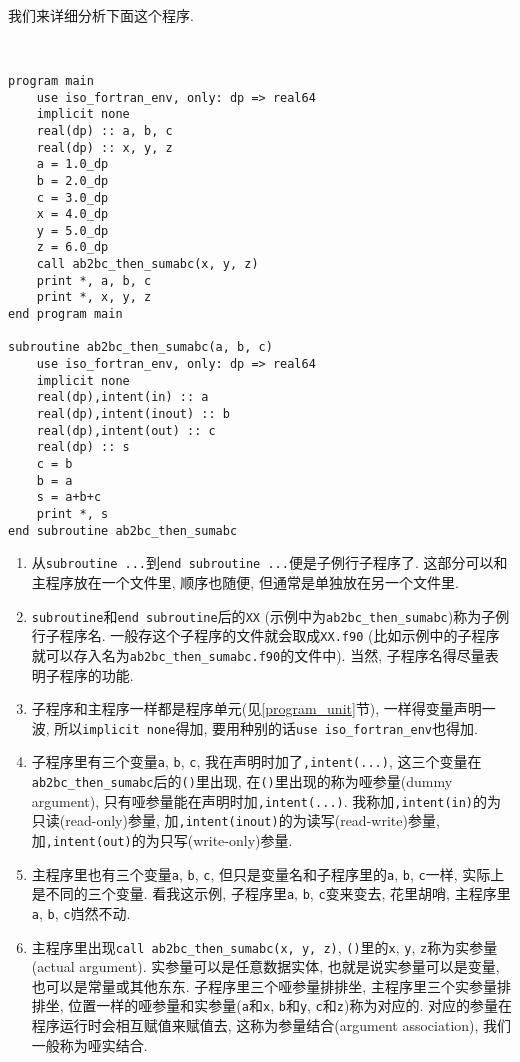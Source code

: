 我们来详细分析下面这个程序.
\begin{lstlisting}


program main
    use iso_fortran_env, only: dp => real64
    implicit none
    real(dp) :: a, b, c
    real(dp) :: x, y, z
    a = 1.0_dp
    b = 2.0_dp
    c = 3.0_dp
    x = 4.0_dp
    y = 5.0_dp
    z = 6.0_dp
    call ab2bc_then_sumabc(x, y, z)
    print *, a, b, c
    print *, x, y, z
end program main

subroutine ab2bc_then_sumabc(a, b, c)
    use iso_fortran_env, only: dp => real64
    implicit none
    real(dp),intent(in) :: a
    real(dp),intent(inout) :: b
    real(dp),intent(out) :: c
    real(dp) :: s
    c = b
    b = a
    s = a+b+c
    print *, s
end subroutine ab2bc_then_sumabc
\end{lstlisting}
\begin{enumerate}
    \item 从\texttt{subroutine ...}到\texttt{end subroutine ...}便是子例行子程序了. 这部分可以和主程序放在一个文件里, 顺序也随便, 但通常是单独放在另一个文件里.
    \item \texttt{subroutine}和\texttt{end subroutine}后的\texttt{XX} (示例中为\texttt{ab2bc\_{}then\_{}sumabc})称为子例行子程序名. 一般存这个子程序的文件就会取成\texttt{XX.f90} (比如示例中的子程序就可以存入名为\texttt{ab2bc\_{}then\_{}sumabc.f90}的文件中). 当然, 子程序名得尽量表明子程序的功能.
    \item 子程序和主程序一样都是程序单元(见\ref{program_unit}节), 一样得变量声明一波, 所以\texttt{implicit none}得加, 要用种别的话\texttt{use iso\_{}fortran\_{}env}也得加.
    \item 子程序里有三个变量\texttt{a}, \texttt{b}, \texttt{c}, 我在声明时加了\texttt{,intent(...)}, 这三个变量在\texttt{ab2bc\_{}then\_{}sumabc}后的\texttt{()}里出现, 在\texttt{()}里出现的称为哑参量(dummy argument), 只有哑参量能在声明时加\texttt{,intent(...)}. 我称加\texttt{,intent(in)}的为只读(read-only)参量, 加\texttt{,intent(inout)}的为读写(read-write)参量, 加\texttt{,intent(out)}的为只写(write-only)参量.
    \item 主程序里也有三个变量\texttt{a}, \texttt{b}, \texttt{c}, 但只是变量名和子程序里的\texttt{a}, \texttt{b}, \texttt{c}一样, 实际上是不同的三个变量. 看我这示例, 子程序里\texttt{a}, \texttt{b}, \texttt{c}变来变去, 花里胡哨, 主程序里\texttt{a}, \texttt{b}, \texttt{c}岿然不动.
    \item 主程序里出现\texttt{call ab2bc\_{}then\_{}sumabc(x, y, z)}, \texttt{()}里的\texttt{x}, \texttt{y}, \texttt{z}称为实参量(actual argument). 实参量可以是任意数据实体, 也就是说实参量可以是变量, 也可以是常量或其他东东. 子程序里三个哑参量排排坐, 主程序里三个实参量排排坐, 位置一样的哑参量和实参量(\texttt{a}和\texttt{x}, \texttt{b}和\texttt{y}, \texttt{c}和\texttt{z})称为对应的. 对应的参量在程序运行时会相互赋值来赋值去, 这称为参量结合(argument association), 我们一般称为哑实结合.

\end{enumerate}
